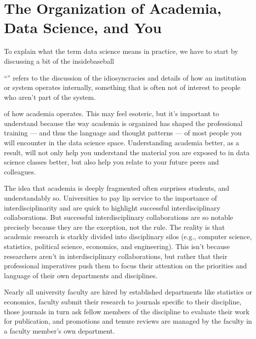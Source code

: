 \documentclass[letterpaper,10pt,english]{jupyterBook}
\begin{document}
\section{The Organization of Academia, Data Science, and You}
\label{\detokenize{10_introduction/40_data_science_in_historical_context:the-organization-of-academia-data-science-and-you}}
\sphinxAtStartPar
To explain what the term data science means in practice, we have to start by discussing a bit of the inside\sphinxhyphen{}baseball%
\begin{footnote}[1]\sphinxAtStartFootnote
“” refers to the discussion of the idiosyncracies and details of how an institution or system operates internally, something that is often not of interest to people who aren’t part of the system.
%
\end{footnote} of how academia operates. This may feel esoteric, but it’s important to understand because the way academia is organized has shaped the professional training — and thus the language and thought patterns — of most people you will encounter in the data science space. Understanding academia better, as a result, will not only help you understand the material you are exposed to in data science classes better, but also help you relate to your future peers and colleagues.

\sphinxAtStartPar
The idea that academia is deeply fragmented often surprises students, and understandably so. Universities  to pay lip service to the importance of interdisciplinarity and are quick to highlight successful interdisciplinary collaborations. But successful interdisciplinary collaborations are so notable precisely because they are the exception, not the rule. The reality is that academic research is starkly divided into disciplinary silos (e.g., computer science, statistics, political science, economics, and engineering). This isn’t because researchers aren’t  in interdisciplinary collaborations, but rather that their professional imperatives push them to focus their attention on the priorities and language of their own departments and disciplines.%
\begin{footnote}[2]\sphinxAtStartFootnote
Nearly all university faculty are hired by established departments like statistics or economics, faculty submit their research to journals specific to their discipline, those journals in turn ask fellow members of the discipline to evaluate their work for publication, and promotions and tenure reviews are managed by the faculty in a faculty member’s own department.
%
\end{footnote}
\end{document}
